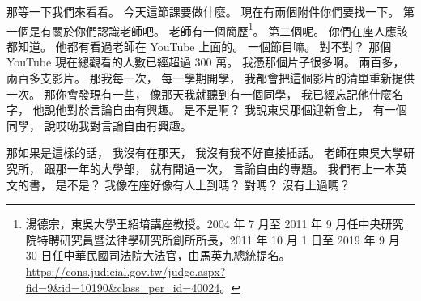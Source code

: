 \hypertarget{w01:cue:563}{}那等一下我們來看看。
\hypertarget{w01:cue:564}{}今天這節課要做什麼。
\hypertarget{w01:cue:565}{}現在有兩個附件你們要找一下。
\hypertarget{w01:cue:566}{}第一個是有關於你們認識老師吧。
\hypertarget{w01:cue:567}{}老師有一個簡歷\footnote{湯德宗，東吳大學王紹堉講座教授。2004 年 7 月至 2011 年 9 月任中央研究院特聘研究員暨法律學研究所創所所長，2011 年 10 月 1 日至 2019 年 9 月 30 日任中華民國司法院大法官，由馬英九總統提名。\url{https://cons.judicial.gov.tw/judge.aspx?fid=9&id=10190&class_per_id=40024}。}。
\hypertarget{w01:cue:568}{}第二個呢。
\hypertarget{w01:cue:569}{}你們在座人應該都知道。
\hypertarget{w01:cue:570}{}他都有看過老師在 YouTube 上面的。
\hypertarget{w01:cue:571}{}一個節目嘛。
\hypertarget{w01:cue:572}{}對不對？
\hypertarget{w01:cue:573}{}那個 YouTube 現在總觀看的人數已經超過 300 萬。
\hypertarget{w01:cue:574}{}我憑那個片子很多啊。
\hypertarget{w01:cue:575}{}兩百多，
\hypertarget{w01:cue:576}{}兩百多支影片。
\hypertarget{w01:cue:577}{}那我每一次，
\hypertarget{w01:cue:578}{}每一學期開學，
\hypertarget{w01:cue:579}{}我都會把這個影片的清單重新提供一次。
\hypertarget{w01:cue:580}{}那你會發現有一些，
\hypertarget{w01:cue:581}{}像那天我就聽到有一個同學，
\hypertarget{w01:cue:582}{}我已經忘記他什麼名字，
\hypertarget{w01:cue:583}{}他說他對於言論自由有興趣。
\hypertarget{w01:cue:584}{}是不是啊？
\hypertarget{w01:cue:585}{}我說東吳那個迎新會上，
\hypertarget{w01:cue:586}{}有一個同學，
\hypertarget{w01:cue:587}{}說哎呦我對言論自由有興趣。

\hypertarget{w01:cue:588}{}那如果是這樣的話，
\hypertarget{w01:cue:589}{}我沒有在那天，
\hypertarget{w01:cue:590}{}我沒有我不好直接插話。
\hypertarget{w01:cue:591}{}老師在東吳大學研究所，
\hypertarget{w01:cue:592}{}跟那一年的大學部，
\hypertarget{w01:cue:593}{}就有開過一次，
\hypertarget{w01:cue:594}{}言論自由的專題。
\hypertarget{w01:cue:595}{}我們有上一本英文的書，
\hypertarget{w01:cue:596}{}是不是？
\hypertarget{w01:cue:597}{}我像在座好像有人上到嗎？
\hypertarget{w01:cue:598}{}對嗎？
\hypertarget{w01:cue:599}{}沒有上過嗎？


